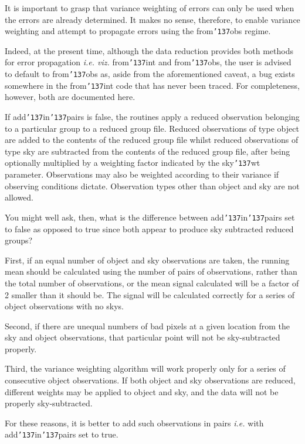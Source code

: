 \documentclass[a4paper]{book}
\renewcommand{\_}{{\tt\char'137}}
\begin{document}
It is important to grasp that variance weighting of errors can only be
used when the errors are already determined. It makes no sense, therefore,
to enable variance weighting and attempt to propagate errors using the
{\sc from\_obs} regime.

Indeed, at the present time, although the data reduction provides both
methods for error propagation {\em i.e. viz.} {\sc from\_int} and {\sc
from\_obs}, the user is advised to default to {\sc from\_obs} as, aside from
the aforementioned caveat, a bug exists somewhere in the {\sc
from\_int} code that has never been traced. For completeness, however,
both are documented here.

If add\_in\_pairs is {\sc false}, the routines apply a reduced observation
belonging to a particular group to a reduced group file.  Reduced
observations of type {\sc object} are added to the contents of the reduced
group file whilst reduced observations of type {\sc sky} are subtracted
from the contents of the reduced group file, after being optionally
multiplied by a weighting factor indicated by the sky\_wt parameter.
Observations may also be weighted according to their variance if observing
conditions dictate. Observation types other than {\sc object} and {\sc
sky} are not allowed.

You might well ask, then, what is the difference between add\_in\_pairs
set to {\sc false} as opposed to {\sc true} since both appear to produce
sky subtracted reduced groups?

First, if an equal number of {\sc object} and {\sc sky} observations are
taken, the running mean should be calculated using the number of pairs of
observations, rather than the total number of observations, or the mean
signal calculated will be a factor of 2 smaller than it should be. The
signal will be calculated correctly for a series of {\sc object}
observations with no {\sc sky}s.

Second, if there are unequal numbers of bad pixels at a given location
from the {\sc sky} and {\sc object} observations, that particular point
will not be sky-subtracted properly.

Third, the variance weighting algorithm will work properly only for a
series of consecutive {\sc object} observations. If both {\sc object} and
{\sc sky} observations are reduced, different weights may be applied to
{\sc object} and {\sc sky}, and the data will not be properly
sky-subtracted.

For these reasons, it is better to add such observations in pairs {\em
i.e.} with add\_in\_pairs set to {\sc true}.
\end{document}
